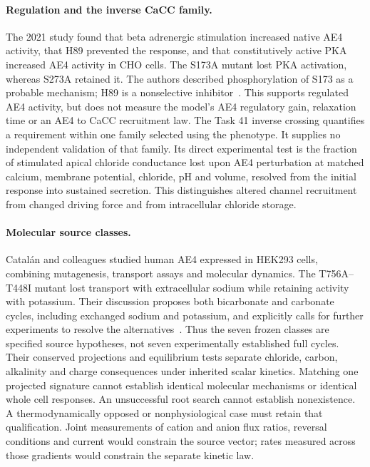 \paragraph{Regulation and the inverse CaCC family.}
The 2021 study found that beta adrenergic stimulation increased native
AE4 activity, that H89 prevented the response, and that constitutively
active PKA increased AE4 activity in CHO cells. The S173A mutant lost
PKA activation, whereas S273A retained it. The authors described
phosphorylation of S173 as a probable mechanism; H89 is a nonselective
inhibitor~\cite{m44Pena2021}.
This supports regulated AE4 activity, but does not measure the model's
AE4 regulatory gain, relaxation time or an AE4 to CaCC recruitment law.
The Task 41 inverse crossing quantifies a requirement within one family
selected using the phenotype. It supplies no independent validation of
that family. Its direct experimental test is the fraction of stimulated
apical chloride conductance lost upon AE4 perturbation at matched
calcium, membrane potential, chloride, pH and volume, resolved from the
initial response into sustained secretion. This distinguishes altered
channel recruitment from changed driving force and from intracellular
chloride storage.

\paragraph{Molecular source classes.}
Catal\'an and colleagues studied human AE4 expressed in HEK293 cells,
combining mutagenesis, transport assays and molecular dynamics. The
T756A--T448I mutant lost transport with extracellular sodium while
retaining activity with potassium. Their discussion proposes both
bicarbonate and carbonate cycles, including exchanged sodium and
potassium, and explicitly calls for further experiments to resolve
the alternatives~\cite{m44Catalan2025}.
Thus the seven frozen classes are specified source hypotheses, not seven
experimentally established full cycles. Their conserved projections
and equilibrium tests separate chloride, carbon, alkalinity and charge
consequences under inherited scalar kinetics. Matching one projected
signature cannot establish identical molecular mechanisms or identical
whole cell responses. An unsuccessful root search cannot establish
nonexistence. A thermodynamically opposed or nonphysiological case must
retain that qualification. Joint measurements of cation and anion
flux ratios, reversal conditions and current would constrain the source
vector; rates measured across those gradients would constrain the
separate kinetic law.

